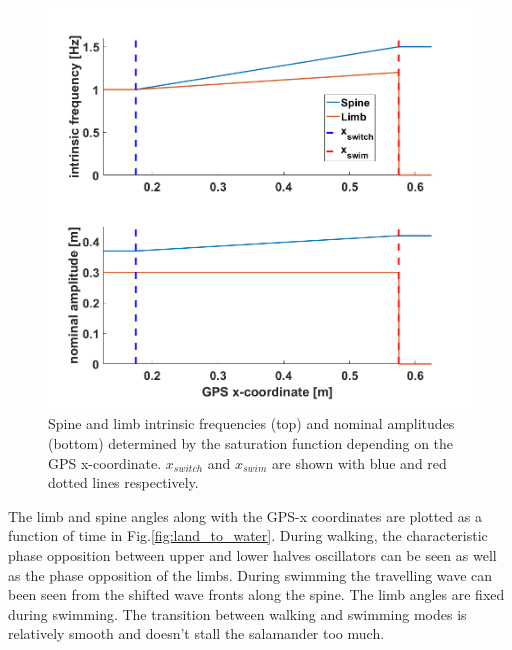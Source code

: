 \documentclass[a4paper]{scrartcl}
\begin{document}
{\begin{figure}
	\centering
	\includegraphics[width=\linewidth]{Figures/saturation.png}
	\caption{\label{fig:saturation}Spine and limb intrinsic frequencies (top) and nominal amplitudes (bottom) determined by the saturation function depending on the GPS x-coordinate. $x_{switch}$ and $x_{swim}$ are shown with blue and red dotted lines respectively.}
\end{figure}

The limb and spine angles along with the GPS-x coordinates are plotted as a function of time in Fig.\ref{fig:land_to_water}. During walking, the characteristic phase opposition between upper and lower halves oscillators can be seen as well as the phase opposition of the limbs. During swimming the travelling wave can been seen from the shifted wave fronts along the spine. The limb angles are fixed during swimming. The transition between walking and swimming modes is relatively smooth and doesn't stall the salamander too much.

}
\end{document}
